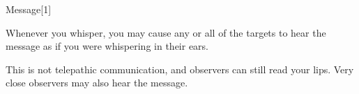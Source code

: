 \begin{spellsection}{Message}[1]
    \begin{spellheader}
    \end{spellheader}
    \begin{spellcontent}
        \begin{spelltargetinginfo}
        \end{spelltargetinginfo}
        \begin{spelleffects}
            \spelleffect Whenever you whisper, you may cause any or all of the targets to hear the message as if you were whispering in their ears.
            \spelldur \durshort
        \end{spelleffects}
    \end{spellcontent}
    \begin{spellfooter}
        \spellnotes This is not telepathic communication, and observers can still read your lips. Very close observers may also hear the message.
        \miscastexplode
    \end{spellfooter}
    \begin{spellaugments}
    \end{spellaugments}
\end{spellsection}

